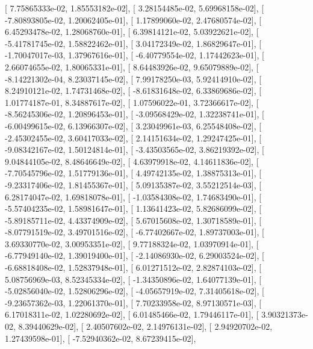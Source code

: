 \documentclass{article}
\begin{document}
       [  7.75865333e-02,   1.85553182e-02],
       [  3.28154485e-02,   5.69968158e-02],
       [ -7.80893805e-02,   1.20062405e-01],
       [  1.17899060e-02,   2.47680574e-02],
       [  6.45293478e-02,   1.28068760e-01],
       [  6.39814121e-02,   5.03922621e-02],
       [ -5.41781745e-02,   1.58822462e-01],
       [  3.04172349e-02,   1.86829647e-01],
       [ -1.70047017e-03,   1.37967616e-01],
       [ -6.40779554e-02,   1.17442623e-01],
       [  2.66074655e-02,   1.80065331e-01],
       [  8.64483926e-02,   9.65079889e-02],
       [ -8.14221302e-04,   8.23037145e-02],
       [  7.99178250e-03,   5.92414910e-02],
       [  8.24910121e-02,   1.74731468e-02],
       [ -8.61831648e-02,   6.33869686e-02],
       [  1.01774187e-01,   8.34887617e-02],
       [  1.07596022e-01,   3.72366617e-02],
       [ -8.56245306e-02,   1.20896453e-01],
       [ -3.09568429e-02,   1.32238741e-01],
       [ -6.00499615e-02,   6.13966307e-02],
       [  3.23049961e-03,   6.25548408e-02],
       [ -2.45302455e-02,   3.60417033e-02],
       [  2.14151634e-02,   1.29247425e-01],
       [ -9.08342167e-02,   1.50124814e-01],
       [ -3.43503565e-02,   3.86219392e-02],
       [  9.04844105e-02,   8.48646649e-02],
       [  4.63979918e-02,   4.14611836e-02],
       [ -7.70545796e-02,   1.51779136e-01],
       [  4.49742135e-02,   1.38875313e-01],
       [ -9.23317406e-02,   1.81455367e-01],
       [  5.09135387e-02,   3.55212514e-03],
       [  6.28174047e-02,   1.69818078e-01],
       [ -1.03584308e-02,   1.74683490e-01],
       [ -5.57404235e-02,   1.58981647e-01],
       [  1.13641423e-02,   5.82686099e-02],
       [ -5.89185711e-02,   4.43374909e-02],
       [  5.67015608e-02,   1.30718589e-01],
       [ -8.07791519e-02,   3.49701516e-02],
       [ -6.77402667e-02,   1.89737003e-01],
       [  3.69330770e-02,   3.00953351e-02],
       [  9.77188324e-02,   1.03970914e-01],
       [ -6.77949140e-02,   1.39019400e-01],
       [ -2.14086930e-02,   6.29003524e-02],
       [ -6.68818408e-02,   1.52837948e-01],
       [  6.01271512e-02,   2.82874103e-02],
       [  5.08756969e-03,   8.52345334e-02],
       [ -1.34350896e-02,   1.64077139e-01],
       [ -5.02856040e-02,   1.52806296e-02],
       [ -4.05657919e-02,   7.31405618e-02],
       [ -9.23657362e-03,   1.22061370e-01],
       [  7.70233958e-02,   8.97130571e-03],
       [  6.17018311e-02,   1.02280692e-02],
       [  6.01485466e-02,   1.79446117e-01],
       [  3.90321373e-02,   8.39440629e-02],
       [  2.40507602e-02,   2.14976131e-02],
       [  2.94920702e-02,   1.27439598e-01],
       [ -7.52940362e-02,   8.67239415e-02],
\end{document}

